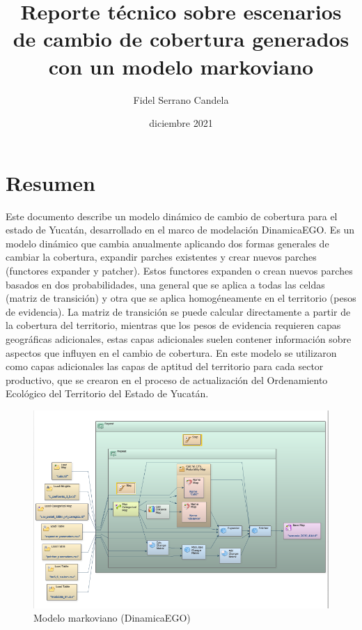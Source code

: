 \documentclass[12pt,a4paper,oldfontcommands]{article}
\title{Reporte técnico sobre escenarios de cambio de cobertura generados con un modelo markoviano}
\author{Fidel Serrano Candela}
\date{diciembre 2021}
\begin{document}
\maketitle
\tableofcontents
\pagebreak

\section{Resumen}

Este documento describe un modelo dinámico de cambio de cobertura para el estado de Yucatán, desarrollado en el marco de modelación DinamicaEGO. Es un modelo dinámico que cambia anualmente aplicando dos formas generales de cambiar la cobertura, expandir parches existentes y crear nuevos parches (functores expander y patcher). Estos functores expanden o crean nuevos parches basados en dos probabilidades, una general que se aplica a todas las celdas (matriz de transición) y otra que se aplica homogéneamente en el territorio (pesos de evidencia). La matriz de transición se puede calcular directamente a partir de la cobertura del territorio, mientras que los pesos de evidencia requieren capas geográficas adicionales, estas capas adicionales suelen contener información sobre aspectos que influyen en el cambio de cobertura. En este modelo se utilizaron como capas adicionales las capas de aptitud del territorio para cada sector productivo, que se crearon en el proceso de actualización del Ordenamiento Ecológico del Territorio del Estado de Yucatán.

\begin{figure}[h]
	\centering
	\includegraphics[width=1\textwidth]{./figuras/modelo.png}
	\caption{Modelo markoviano (DinamicaEGO)}
\end{figure}
\end{document}

